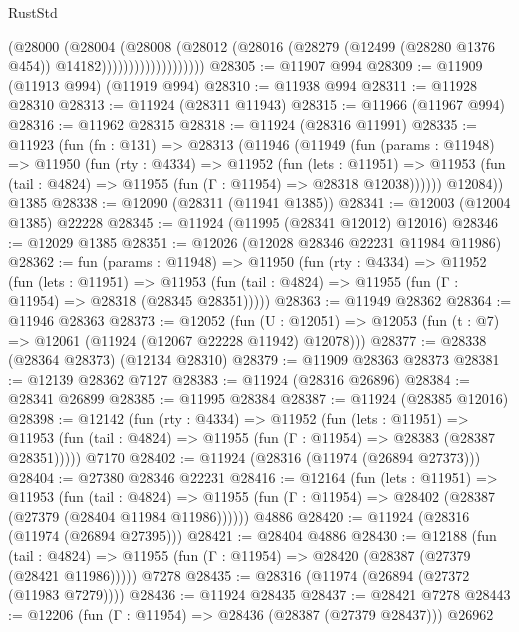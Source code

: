 \begin{lexlean}{RustStd}
\begin{coremodule}
                              (@28000
                                (@28004
                                  (@28008
                                    (@28012
                                      (@28016
                                        (@28279
                                          (@12499 (@28280 @1376 @454))
                                          @14182)))))))))))))))))))
@28305 := @11907 @994
@28309 := @11909 (@11913 @994) (@11919 @994)
@28310 := @11938 @994
@28311 := @11928 @28310
@28313 := @11924 (@28311 @11943)
@28315 := @11966 (@11967 @994)
@28316 := @11962 @28315
@28318 := @11924 (@28316 @11991)
@28335 := @11923
    (fun (fn : @131) =>
    @28313
      (@11946
        (@11949
          (fun (params : @11948) =>
          @11950
            (fun (rty : @4334) =>
            @11952
              (fun (lets : @11951) =>
              @11953 (fun (tail : @4824) => @11955 (fun (Γ : @11954) => @28318 @12038))))))
        @12084))
    @1385
@28338 := @12090 (@28311 (@11941 @1385))
@28341 := @12003 (@12004 @1385) @22228
@28345 := @11924 (@11995 (@28341 @12012) @12016)
@28346 := @12029 @1385
@28351 := @12026 (@12028 @28346 @22231 @11984 @11986)
@28362 := fun (params : @11948) =>
  @11950
    (fun (rty : @4334) =>
    @11952
      (fun (lets : @11951) =>
      @11953 (fun (tail : @4824) => @11955 (fun (Γ : @11954) => @28318 (@28345 @28351)))))
@28363 := @11949 @28362
@28364 := @11946 @28363
@28373 := @12052
    (fun (U : @12051) => @12053 (fun (t : @7) => @12061 (@11924 (@12067 @22228 @11942) @12078)))
@28377 := @28338 (@28364 @28373) (@12134 @28310)
@28379 := @11909 @28363 @28373
@28381 := @12139 @28362 @7127
@28383 := @11924 (@28316 @26896)
@28384 := @28341 @26899
@28385 := @11995 @28384
@28387 := @11924 (@28385 @12016)
@28398 := @12142
    (fun (rty : @4334) =>
    @11952
      (fun (lets : @11951) =>
      @11953 (fun (tail : @4824) => @11955 (fun (Γ : @11954) => @28383 (@28387 @28351)))))
    @7170
@28402 := @11924 (@28316 (@11974 (@26894 @27373)))
@28404 := @27380 @28346 @22231
@28416 := @12164
    (fun (lets : @11951) =>
    @11953
      (fun (tail : @4824) =>
      @11955 (fun (Γ : @11954) => @28402 (@28387 (@27379 (@28404 @11984 @11986))))))
    @4886
@28420 := @11924 (@28316 (@11974 (@26894 @27395)))
@28421 := @28404 @4886
@28430 := @12188
    (fun (tail : @4824) => @11955 (fun (Γ : @11954) => @28420 (@28387 (@27379 (@28421 @11986)))))
    @7278
@28435 := @28316 (@11974 (@26894 (@27372 (@11983 @7279))))
@28436 := @11924 @28435
@28437 := @28421 @7278
@28443 := @12206 (fun (Γ : @11954) => @28436 (@28387 (@27379 @28437))) @26962

\end{coremodule}
\end{lexlean}
